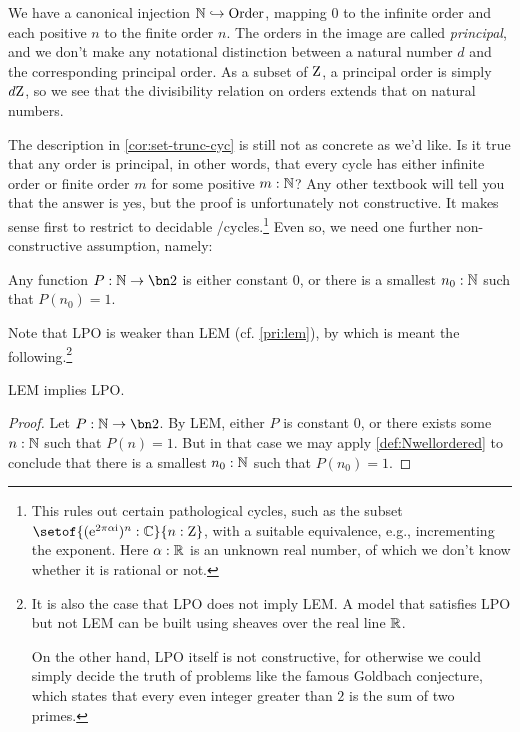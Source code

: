 We have a canonical injection $\mathbb{N} \hookrightarrow \mathrm{Order}$,
mapping $0$ to the infinite order and each positive $n$ to the finite order $n$.
The orders in the image are called \emph{principal},
and we don't make any notational distinction between a natural number $d$
and the corresponding principal order.
As a subset of $\mathrm{Z}$, a principal order is simply $d\mathrm{Z}$,
so we see that the divisibility relation on orders extends that on natural numbers.

The description in \cref{cor:set-trunc-cyc} is still not as concrete as we'd like.
Is it true that any order is principal, in other words,
that every cycle has either infinite order or finite order $m$
for some positive $m:\mathbb{N}$?
Any other textbook will tell you that the answer is yes,
but the proof is unfortunately not constructive.
It makes sense first to restrict to decidable \coverings/cycles.\footnote{%
  This rules out certain pathological cycles,
  such as the subset $\setof{(\ee^{2\pi\alpha\ii})^n:\CC}{n:\zet}$,
  with a suitable equivalence, e.g., incrementing the exponent.
  Here $\alpha:\mathbb{R}$ is an unknown real number,
  of which we don't know whether it is rational or not.}
Even so, we need one further non-constructive assumption, namely:

\begin{principle}
  \label{LPO}
  Any function $P:\NN\to\bn 2$ is either constant $0$,
  or there is a smallest $n_0:\mathbb{N}$ such that $P(n_0)=1$.
\end{principle}

Note that LPO is weaker than LEM (cf. \cref{pri:lem}), by which is meant the following.\footnote{%
  It is also the case that LPO does not imply LEM. A model that satisfies LPO but not LEM can be built using sheaves over the real line $\mathbb{R}$.

  On the other hand, LPO itself is not constructive,
  for otherwise we could simply decide the truth
  of problems like the famous Goldbach conjecture,
  which states that every even integer greater than $2$ is the sum of two primes.}
\begin{lemma}
  LEM implies LPO.
\end{lemma}

\begin{proof}
  Let $P:\NN\to\bn 2$. By LEM, either $P$ is constant $0$,
  or there exists some $n:\mathbb{N}$ such that $P(n)=1$.
  But in that case we may apply \cref{def:Nwellordered}
  to conclude that there is a smallest $n_0:\mathbb{N}$ such that $P(n_0)=1$.
\end{proof}

